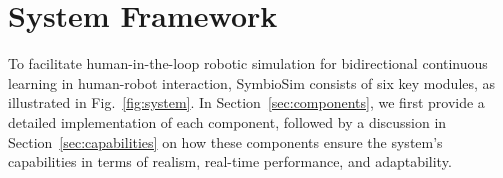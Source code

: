 \section{System Framework}







To facilitate human-in-the-loop robotic simulation for bidirectional continuous learning in human-robot interaction, SymbioSim consists of six key modules, as illustrated in Fig.~\ref{fig:system}. In Section~\ref{sec:components}, we first provide a detailed implementation of each component, followed by a discussion in Section~\ref{sec:capabilities} on how these components ensure the system's capabilities in terms of realism, real-time performance, and adaptability.

